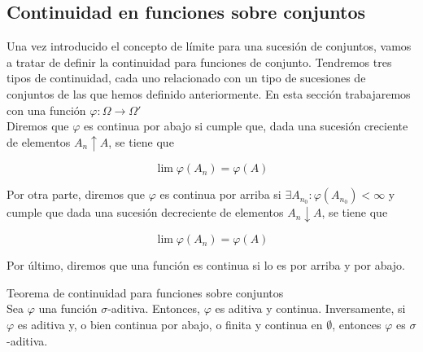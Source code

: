 \subsection{Continuidad en funciones sobre conjuntos}

Una vez introducido el concepto de límite para una sucesión de conjuntos, vamos a tratar de definir la continuidad para funciones de conjunto. Tendremos tres tipos de continuidad, cada uno relacionado con un tipo de sucesiones de conjuntos de las que hemos definido anteriormente. En esta sección trabajaremos con una función $\varphi : \Omega \to \Omega'$\\

Diremos que $\varphi$ es continua por abajo si cumple que, dada una sucesión creciente de elementos $A_n \uparrow A$, se tiene que

$$ \lim \varphi (A_n) = \varphi (A) $$

Por otra parte, diremos que $\varphi$ es continua por arriba si $\exists A_{n_0} : \varphi (A_{n_0}) < \infty$ y cumple que dada una sucesión decreciente de elementos $A_n \downarrow A$, se tiene que

$$ \lim \varphi (A_n) = \varphi (A)$$

Por último, diremos que una función es continua si lo es por arriba y por abajo.

\begin{theorem}
Teorema de continuidad para funciones sobre conjuntos\\

Sea $\varphi$ una función $\sigma$-aditiva. Entonces, $\varphi$ es aditiva y continua. Inversamente, si $\varphi$ es aditiva y, o bien continua por abajo, o finita y continua en $\emptyset$, entonces $\varphi$ es $\sigma$-aditiva.
\end{theorem}

